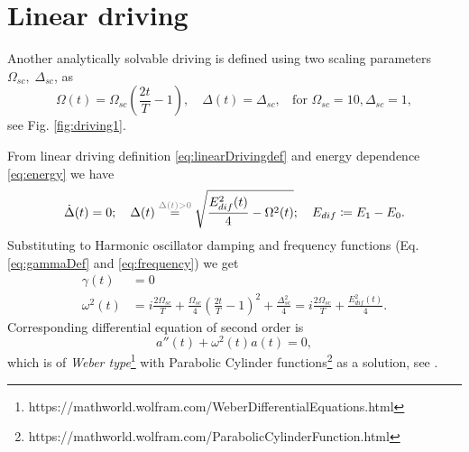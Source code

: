 \newpage 
\section{Linear driving}
Another analytically solvable driving is defined using two scaling parameters $\Omega_{sc},\;\Delta_{sc}$, as 
\begin{equation}
    \Omega(t)=\Omega_{sc}\left(\frac{2t}{T}-1\right),\quad \Delta(t)=\Delta_{sc}, \;\;\text{ for } \Omega_{sc}=10, \Delta_{sc}=1,
    \label{eq:linearDrivingdef}
\end{equation}
see Fig. \ref{fig:driving1}. 

From linear driving definition \ref{eq:linearDrivingdef} and energy dependence \ref{eq:energy} we have
\begin{equation}
    \dot \Delta(t)=0;\quad \Delta(t) \overset{\textcolor{gray}{\Delta(t)>0}}{=} \sqrt{\frac{E^2_{dif}(t)}{4}-\Omega^2(t)};\quad E_{dif}\coloneqq E_1-E_0.
\end{equation}
Substituting to Harmonic oscillator damping and frequency functions (Eq. \ref{eq:gammaDef} and \ref{eq:frequency}) we get 
\begin{align}
    \gamma(t) &= 0\\
    \omega^2(t)&=i\frac{2\Omega_{sc}}{T}+\frac{\Omega_{sc}}{4}\left(\frac{2t}{T}-1\right)^2+\frac{\Delta_{sc}^2}{4}=i\frac{2\Omega_{sc}}{T}+\frac{E^2_{dif}(t)}{4}.
    \label{eq:oscillationsLinear}
\end{align}
Corresponding differential equation of second order is
\begin{equation}
    a''(t)+\omega^2(t) a(t)=0,
\end{equation}
which is of \emph{Weber type}\footnote{https://mathworld.wolfram.com/WeberDifferentialEquations.html} with Parabolic Cylinder functions\footnote{https://mathworld.wolfram.com/ParabolicCylinderFunction.html} as a solution, see \citet{felipe}. 

